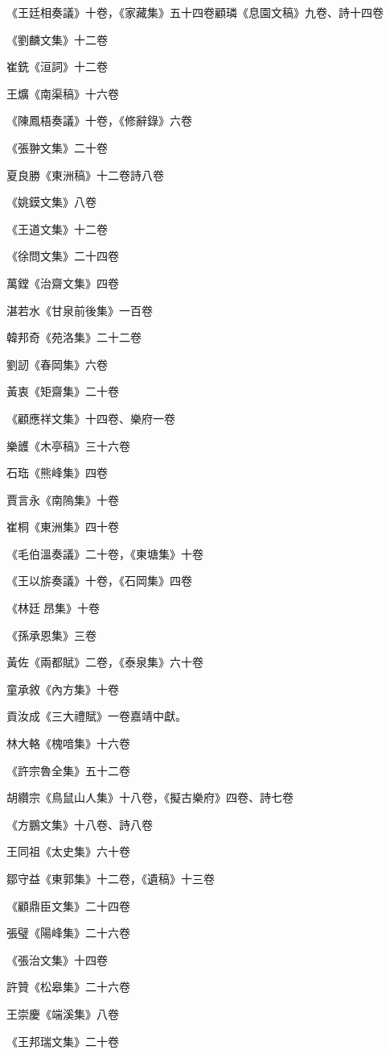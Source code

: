 《王廷相奏議》十卷，《家藏集》五十四卷顧璘《息園文稿》九卷、詩十四卷

《劉麟文集》十二卷

崔銑《洹詞》十二卷

王爌《南渠稿》十六卷

《陳鳳梧奏議》十卷，《修辭錄》六卷

《張翀文集》二十卷

夏良勝《東洲稿》十二卷詩八卷

《姚鏌文集》八卷

《王道文集》十二卷

《徐問文集》二十四卷

萬鏜《治齋文集》四卷

湛若水《甘泉前後集》一百卷

韓邦奇《苑洛集》二十二卷

劉訒《春岡集》六卷

黃衷《矩齋集》二十卷

《顧應祥文集》十四卷、樂府一卷

樂頀《木亭稿》三十六卷

石珤《熊峰集》四卷

賈言永《南隖集》十卷

崔桐《東洲集》四十卷

《毛伯溫奏議》二十卷，《東塘集》十卷

《王以旂奏議》十卷，《石岡集》四卷

《林廷昂集》十卷

《孫承恩集》三卷

黃佐《兩都賦》二卷，《泰泉集》六十卷

童承敘《內方集》十卷

貢汝成《三大禮賦》一卷嘉靖中獻。

林大輅《槐喑集》十六卷

《許宗魯全集》五十二卷

胡纘宗《鳥鼠山人集》十八卷，《擬古樂府》四卷、詩七卷

《方鵬文集》十八卷、詩八卷

王同祖《太史集》六十卷

鄒守益《東郭集》十二卷，《遺稿》十三卷

《顧鼎臣文集》二十四卷

張璧《陽峰集》二十六卷

《張治文集》十四卷

許贊《松皋集》二十六卷

王崇慶《端溪集》八卷

《王邦瑞文集》二十卷

